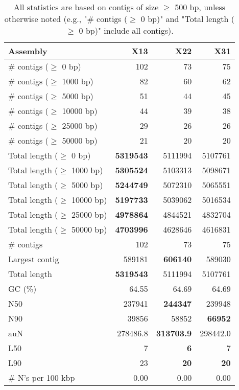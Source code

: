 \documentclass[12pt,a4paper]{article}
\begin{document}
\begin{table}[ht]
\begin{center}
\caption{All statistics are based on contigs of size $\geq$ 500 bp, unless otherwise noted (e.g., "\# contigs ($\geq$ 0 bp)" and "Total length ($\geq$ 0 bp)" include all contigs).}
\begin{tabular}{|l*{3}{|r}|}
\hline
Assembly & X13 & X22 & X31 \\ \hline
\# contigs ($\geq$ 0 bp) & 102 & 73 & 75 \\ \hline
\# contigs ($\geq$ 1000 bp) & 82 & 60 & 62 \\ \hline
\# contigs ($\geq$ 5000 bp) & 51 & 44 & 45 \\ \hline
\# contigs ($\geq$ 10000 bp) & 44 & 39 & 38 \\ \hline
\# contigs ($\geq$ 25000 bp) & 29 & 26 & 26 \\ \hline
\# contigs ($\geq$ 50000 bp) & 21 & 20 & 20 \\ \hline
Total length ($\geq$ 0 bp) & {\bf 5319543} & 5111994 & 5107761 \\ \hline
Total length ($\geq$ 1000 bp) & {\bf 5305524} & 5103313 & 5098671 \\ \hline
Total length ($\geq$ 5000 bp) & {\bf 5244749} & 5072310 & 5065551 \\ \hline
Total length ($\geq$ 10000 bp) & {\bf 5197733} & 5039062 & 5016534 \\ \hline
Total length ($\geq$ 25000 bp) & {\bf 4978864} & 4844521 & 4832704 \\ \hline
Total length ($\geq$ 50000 bp) & {\bf 4703996} & 4628646 & 4616831 \\ \hline
\# contigs & 102 & 73 & 75 \\ \hline
Largest contig & 589181 & {\bf 606140} & 589030 \\ \hline
Total length & {\bf 5319543} & 5111994 & 5107761 \\ \hline
GC (\%) & 64.55 & 64.69 & 64.69 \\ \hline
N50 & 237941 & {\bf 244347} & 239948 \\ \hline
N90 & 39856 & 58852 & {\bf 66952} \\ \hline
auN & 278486.8 & {\bf 313703.9} & 298442.0 \\ \hline
L50 & 7 & {\bf 6} & 7 \\ \hline
L90 & 23 & {\bf 20} & {\bf 20} \\ \hline
\# N's per 100 kbp & 0.00 & 0.00 & 0.00 \\ \hline
\end{tabular}
\end{center}
\end{table}
\end{document}
